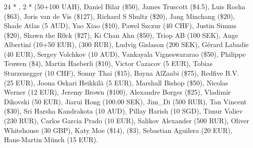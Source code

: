\subsubsection*{}

24 * , 
2 *  (50+100 UAH), 
Daniel Bilar (\$50), 
James Truscott (\$4.5),
Luis Rocha (\$63), 
Joris van de Vis (\$127), 
Richard S Shultz (\$20), 
Jang Minchang (\$20), 
Shade Atlas (5 AUD), 
Yao Xiao (\$10),
Pawel Szczur (40 CHF), 
Justin Simms (\$20), 
Shawn the R0ck (\$27), 
Ki Chan Ahn (\$50), 
Triop AB (100 SEK), 
Ange Albertini (10+50 EUR),
 (300 RUR), 
Ludvig Gislason (200 SEK), 
Gérard Labadie (40 EUR), 
Sergey Volchkov (10 AUD),
Vankayala Vigneswararao (\$50),
Philippe Teuwen (\$4),
Martin Haeberli (\$10),
Victor Cazacov (5 EUR),
Tobias Sturzenegger (10 CHF),
Sonny Thai (\$15),
Bayna AlZaabi (\$75),
Redfive B.V. (25 EUR),
Joona Oskari Heikkilä (5 EUR),
Marshall Bishop (\$50),
Nicolas Werner (12 EUR),
Jeremy Brown (\$100),
Alexandre Borges (\$25),
Vladimir Dikovski (50 EUR),
Jiarui Hong (100.00 SEK),
Jim\_Di (500 RUR),
Tan Vincent (\$30),
Sri Harsha Kandrakota (10 AUD),
Pillay Harish (10 SGD),
Timur Valiev (230 RUR),
Carlos Garcia Prado (10 EUR),
Salikov Alexander (500 RUR),
Oliver Whitehouse (30 GBP),
Katy Moe (\$14),
 (\$3),
Sebastian Aguilera (20 EUR),
Hans-Martin Münch (15 EUR).
